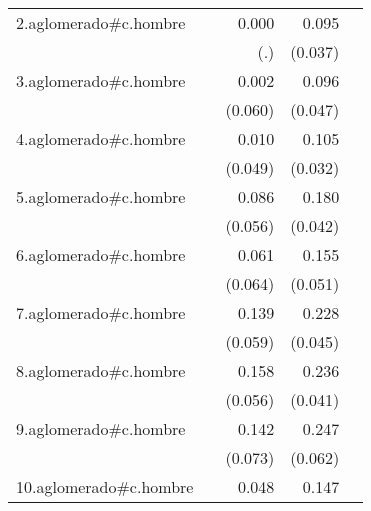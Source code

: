 {\begin{longtable}{l*{4}{D{.}{.}{-1}}}
\addlinespace
2.aglomerado#c.hombre&                     &       0.000         &       0.095\sym{*}  &                     \\
            &                     &         (.)         &     (0.037)         &                     \\
\addlinespace
3.aglomerado#c.hombre&                     &       0.002         &       0.096\sym{*}  &                     \\
            &                     &     (0.060)         &     (0.047)         &                     \\
\addlinespace
4.aglomerado#c.hombre&                     &       0.010         &       0.105\sym{***}&                     \\
            &                     &     (0.049)         &     (0.032)         &                     \\
\addlinespace
5.aglomerado#c.hombre&                     &       0.086         &       0.180\sym{***}&                     \\
            &                     &     (0.056)         &     (0.042)         &                     \\
\addlinespace
6.aglomerado#c.hombre&                     &       0.061         &       0.155\sym{**} &                     \\
            &                     &     (0.064)         &     (0.051)         &                     \\
\addlinespace
7.aglomerado#c.hombre&                     &       0.139\sym{*}  &       0.228\sym{***}&                     \\
            &                     &     (0.059)         &     (0.045)         &                     \\
\addlinespace
8.aglomerado#c.hombre&                     &       0.158\sym{**} &       0.236\sym{***}&                     \\
            &                     &     (0.056)         &     (0.041)         &                     \\
\addlinespace
9.aglomerado#c.hombre&                     &       0.142         &       0.247\sym{***}&                     \\
            &                     &     (0.073)         &     (0.062)         &                     \\
\addlinespace
10.aglomerado#c.hombre&                     &       0.048         &       0.147\sym{***}&                     \\

\end{longtable}}
